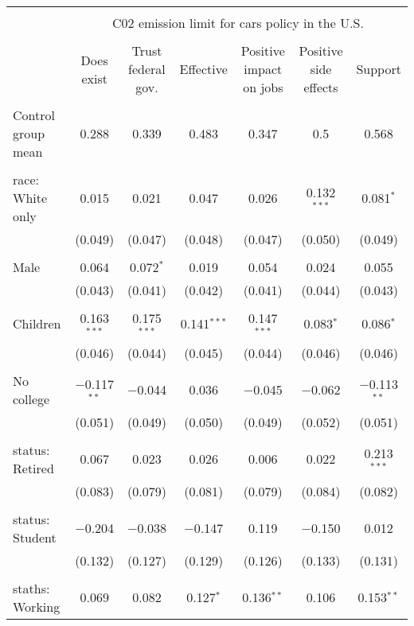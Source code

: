 
\begin{tabular}{@{\extracolsep{5pt}}lcccccc} 
\\[-1.8ex]\hline 
\hline \\[-1.8ex] 
 & \multicolumn{6}{c}{C02 emission limit for cars policy in the U.S.} \\ 
\cline{2-7} 
\\[-1.8ex] & Does exist & Trust federal gov. & Effective & Positive impact on jobs & Positive side effects & Support \\ 
\hline \\[-1.8ex] 
 Control group mean & 0.288 & 0.339 & 0.483 & 0.347 & 0.5 & 0.568  \\ \hline \\[-1.8ex] race: White only & 0.015 & 0.021 & 0.047 & 0.026 & 0.132$^{***}$ & 0.081$^{*}$ \\ 
  & (0.049) & (0.047) & (0.048) & (0.047) & (0.050) & (0.049) \\ 
  & & & & & & \\ 
 Male & 0.064 & 0.072$^{*}$ & 0.019 & 0.054 & 0.024 & 0.055 \\ 
  & (0.043) & (0.041) & (0.042) & (0.041) & (0.044) & (0.043) \\ 
  & & & & & & \\ 
 Children & 0.163$^{***}$ & 0.175$^{***}$ & 0.141$^{***}$ & 0.147$^{***}$ & 0.083$^{*}$ & 0.086$^{*}$ \\ 
  & (0.046) & (0.044) & (0.045) & (0.044) & (0.046) & (0.046) \\ 
  & & & & & & \\ 
 No college & $-$0.117$^{**}$ & $-$0.044 & 0.036 & $-$0.045 & $-$0.062 & $-$0.113$^{**}$ \\ 
  & (0.051) & (0.049) & (0.050) & (0.049) & (0.052) & (0.051) \\ 
  & & & & & & \\ 
 status: Retired & 0.067 & 0.023 & 0.026 & 0.006 & 0.022 & 0.213$^{***}$ \\ 
  & (0.083) & (0.079) & (0.081) & (0.079) & (0.084) & (0.082) \\ 
  & & & & & & \\ 
 status: Student & $-$0.204 & $-$0.038 & $-$0.147 & 0.119 & $-$0.150 & 0.012 \\ 
  & (0.132) & (0.127) & (0.129) & (0.126) & (0.133) & (0.131) \\ 
  & & & & & & \\ 
 staths: Working & 0.069 & 0.082 & 0.127$^{*}$ & 0.136$^{**}$ & 0.106 & 0.153$^{**}$ \\ 

\end{tabular}

